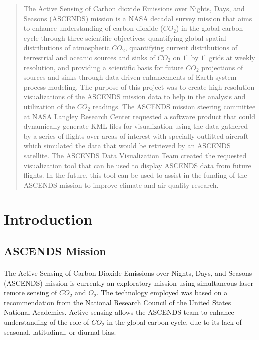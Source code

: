 \documentclass[12pt,letterpaper]{report}
\begin{document}
 

 \begin{abstract}
  The Active Sensing of Carbon dioxide Emissions over Nights, Days, and Seasons (ASCENDS) mission is a NASA decadal survey mission that aims to enhance understanding of carbon dioxide ($CO_2$) in the global carbon cycle through three scientific objectives: quantifying global spatial distributions of atmospheric $CO_2$, quantifying current distributions of terrestrial and oceanic sources and sinks of $CO_2$ on $1^\circ$ by $1^\circ$ grids at weekly resolution, and providing a scientific basis for future $CO_2$ projections of sources and sinks through data-driven enhancements of Earth system process modeling. The purpose of this project was to create high resolution visualizations of the ASCENDS mission data to help in the analysis and utilization of the $CO_2$ readings. The ASCENDS mission steering committee at NASA Langley Research Center requested a software product that could dynamically generate KML files for visualization using the data gathered by a series of flights over areas of interest with specially outfitted aircraft which simulated the data that would be retrieved by an ASCENDS satellite. The ASCENDS Data Visualization Team created the requested visualization tool that can be used to display ASCENDS data from future flights. In the future, this tool can be used to assist in the funding of the ASCENDS mission to improve climate and air quality research.
 \end{abstract}

 \section*{Introduction}
  \subsection*{ASCENDS Mission}
   \paragraph{}
    The Active Sensing of Carbon Dioxide Emissions over Nights, Days, and Seasons (ASCENDS) mission is currently an exploratory mission using simultaneous laser remote sensing of $CO_2$ and $O_2$. The technology employed was based on a recommendation from the National Research Council of the United States National Academies. Active sensing allows the ASCENDS team to enhance understanding of the role of $CO_2$ in the global carbon cycle, due to its lack of seasonal, latitudinal, or diurnal bias.
\end{document}

